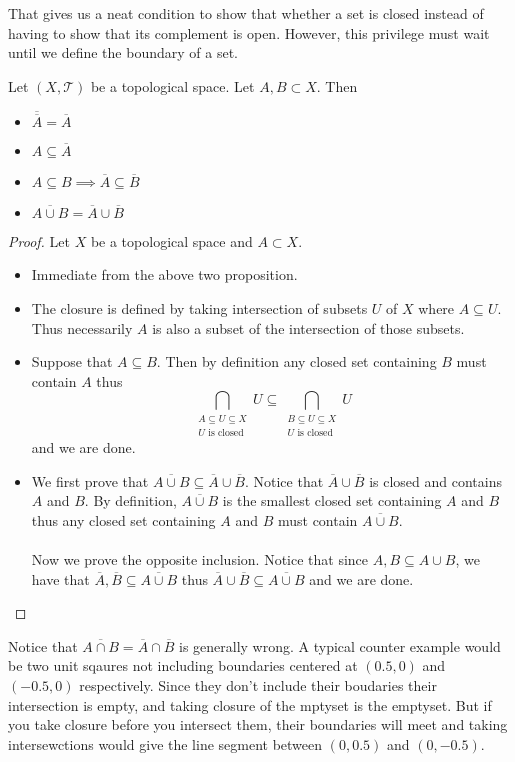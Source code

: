 \documentclass[a4paper]{article}
\begin{document}
That gives us a neat condition to show that whether a set is closed instead of having to show that its complement is open. However, this privilege must wait until we define the boundary of a set. 

\begin{prp}{}{} Let $(X,\mathcal{T})$ be a topological space. Let $A,B\subset X$. Then 
\begin{itemize}
\item $\overline{\overline{A}}=\overline{A}$
\item $A\subseteq\overline{A}$
\item $A\subseteq B\implies\overline{A}\subseteq\overline{B}$
\item $\overline{A\cup B}=\overline{A}\cup\overline{B}$
\end{itemize}\tcbline
\begin{proof} Let $X$ be a topological space and $A\subset X$. 
\begin{itemize}
\item Immediate from the above two proposition. 
\item The closure is defined by taking intersection of subsets $U$ of $X$ where $A\subseteq U$. Thus necessarily $A$ is also a subset of the intersection of those subsets. 
\item Suppose that $A\subseteq B$. Then by definition any closed set containing $B$ must contain $A$ thus $$\bigcap_{\substack{A\subseteq U\subseteq X\\U\text{ is closed}}}U\subseteq\bigcap_{\substack{B\subseteq U\subseteq X\\U\text{ is closed}}}U$$ and we are done. 
\item We first prove that $\overline{A\cup B}\subseteq\overline{A}\cup\overline{B}$. Notice that $\overline{A}\cup\overline{B}$ is closed and contains $A$ and $B$. By definition, $\overline{A\cup B}$ is the smallest closed set containing $A$ and $B$ thus any closed set containing $A$ and $B$ must contain $\overline{A\cup B}$. \\~\\
Now we prove the opposite inclusion. Notice that since $A,B\subseteq A\cup B$, we have that $\overline{A},\overline{B}\subseteq\overline{A\cup B}$ thus $\overline{A}\cup\overline{B}\subseteq\overline{A\cup B}$ and we are done. 
\end{itemize}
\end{proof}
\end{prp}

Notice that $\overline{A \cap B}=\overline{A}\cap\overline{B}$ is generally wrong. A typical counter example would be two unit sqaures not including boundaries centered at $(0.5,0)$ and $(-0.5,0)$ respectively. Since they don't include their boudaries their intersection is empty, and taking closure of the mptyset is the emptyset. But if you take closure before you intersect them, their boundaries will meet and taking intersewctions would give the line segment between $(0,0.5)$ and $(0,-0.5)$. \\~\\
\end{document}
